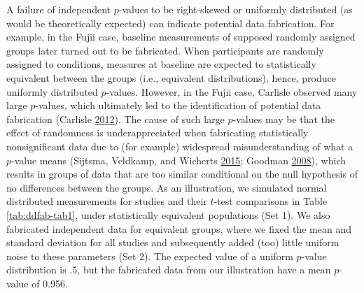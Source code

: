 \documentclass[a5paper]{book}
\begin{document}
A failure of independent \(p\)-values to be right-skewed or uniformly
distributed (as would be theoretically expected) can indicate potential
data fabrication. For example, in the Fujii case, baseline measurements
of supposed randomly assigned groups later turned out to be fabricated.
When participants are randomly assigned to conditions, measures at
baseline are expected to statistically equivalent between the groups
(i.e., equivalent distributions), hence, produce uniformly distributed
\(p\)-values. However, in the Fujii case, Carlisle observed many large
\(p\)-values, which ultimately led to the identification of potential
data fabrication (Carlisle
\protect\hyperlink{ref-doi:10.1111ux2fj.1365-2044.2012.07128.x}{2012}).
The cause of such large \(p\)-values may be that the effect of
randomness is underappreciated when fabricating statistically
nonsignificant data due to (for example) widespread misunderstanding of
what a \(p\)-value means (Sijtsma, Veldkamp, and Wicherts
\protect\hyperlink{ref-doi:10.1007ux2fs11336-015-9444-2}{2015}; Goodman
\protect\hyperlink{ref-doi:10.1053ux2fj.seminhematol.2008.04.003}{2008}),
which results in groups of data that are too similar conditional on the
null hypothesis of no differences between the groups. As an
illustration, we simulated normal distributed measurements for studies
and their \(t\)-test comparisons in Table \ref{tab:ddfab-tab1}, under
statistically equivalent populations (Set 1). We also fabricated
independent data for equivalent groups, where we fixed the mean and
standard deviation for all studies and subsequently added (too) little
uniform noise to these parameters (Set 2). The expected value of a
uniform \(p\)-value distribution is .5, but the fabricated data from our
illustration have a mean \(p\)-value of 0.956.
\end{document}
